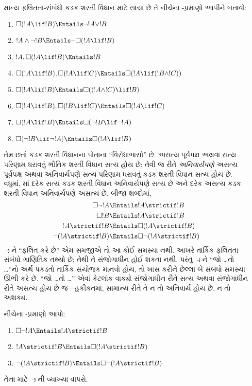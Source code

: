 \documentclass[../../../include/open-logic-section]{subfiles}
\begin{document}
\begin{prob}
  માન્ય ફલિતતા-સંબંધો કડક શરતી વિધાન માટે સાચા છે તે નીચેના
  -પ્રમાણો આપીને બતાવો:
  \begin{enumerate}
  \item  $\Box(!A \lif !B) \Entails \lnot !A \lor !B$
  \item $!A \land \lnot !B \Entails \lnot\Box(!A \lif !B)$
  \item $!A, \Box(!A \lif !B) \Entails !B$
  \item $\Box(!A \lif !B), \Box(!A \lif !C) \Entails \Box(!A \lif (!B
    \land !C))$
  \item $\Box(!A \lif !B) \Entails \Box((!A \land !C) \lif !B)$
  \item $\Box(!A \lif !B), \Box(!B \lif !C) \Entails \Box(!A
    \lif !C)$
  \item $\Box(!A \lif !B) \Entails \Box(\lnot !B \lif \lnot !A)$
  \item $\Box(\lnot !B \lif \lnot !A) \Entails \Box(!A \lif !B)$
  \end{enumerate}
  \end{prob}

તેમ છતાં કડક શરતી વિધાનના પોતાના ``વિરોધાભાસો'' છે. અસત્ય પૂર્વપક્ષ
અથવા સત્ય પરિણામ ધરાવતું ભૌતિક શરતી વિધાન સત્ય હોય છે; તેવી જ રીતે
\emph{અનિવાર્યપણે} અસત્ય પૂર્વપક્ષ અથવા અનિવાર્યપણે સત્ય પરિણામ ધરાવતું
કડક શરતી વિધાન સત્ય હોય છે. વધુમાં, માં દરેક સત્ય કડક શરતી
વિધાન અનિવાર્યપણે સત્ય છે અને દરેક અસત્ય કડક શરતી વિધાન અનિવાર્યપણે
અસત્ય છે. બીજા શબ્દોમાં,
\begin{align}
  \Box \lnot !A & \Entails !A \strictif !B\\
  \Box !B & \Entails !A \strictif !B\\
  !A \strictif !B& \Entails \Box(!A \strictif !B)\\
  \lnot(!A \strictif !B) & \Entails \Box\lnot(!A \strictif !B)
\end{align}
$\strictif$ને ``ફલિત કરે છે'' એમ સમજીએ તો આ કોઈ સમસ્યા નથી.
આખરે તાર્કિક ફલિતતા-સંબંધો ગાણિતિક તથ્યો છે; તેથી તે સંજોગાધીન
હોઈ શકતા નથી. પરંતુ $\strictif$ને ``જો \dots તો \dots''નો અર્થ
પકડતો તાર્કિક સંયોજક માનવો હોય, તો ખાસ કરીને છેલ્લા બે સંબંધો
સમસ્યા ઊભી કરે છે. ``જો \dots તો \dots'' એવાં કેટલાંક વાક્યો
સંજોગાધીન રીતે સત્ય અથવા સંજોગાધીન રીતે અસત્ય હોય છે જ---હકીકતમાં,
સામાન્ય રીતે તે ન તો અનિવાર્ય હોય છે, ન તો અશક્ય.

\begin{prob}
  નીચેના -પ્રમાણો આપો:
  \begin{enumerate}
    \item  $\Box \lnot !A \Entails !A \strictif !B$
    \item $!A \strictif !B \Entails \Box(!A \strictif !B)$
    \item $\lnot(!A \strictif !B)  \Entails \Box\lnot(!A \strictif !B)$
  \end{enumerate}
  તેના માટે $\strictif$ની વ્યાખ્યા વાપરો.
\end{prob}
\end{document}
